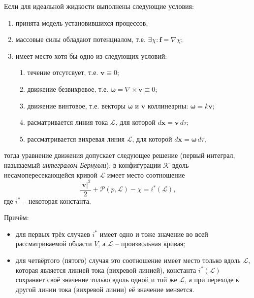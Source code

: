
\begin{theorem}
  Если для идеальной жидкости выполнены следующие условия:
  \begin{enumerate}
    \item принята модель установившихся процессов;
    \item массовые силы обладают потенциалом, т.е. $\exists \chi : \mathbf{f} = \nabla \chi$;
    \item имеет место хотя бы одно из следующих условий:
      \begin{enumerate}
        \item течение отсутсвует, т.е. $\mathbf{v} \equiv 0$;
        \item движение безвихревое, т.е. $\mathbf{\omega} = \nabla \times \mathbf{v} \equiv 0$;
        \item движение винтовое, т.е. векторы $\mathbf{\omega}$ и $\mathbf{v}$ коллинеарны:
          $\mathbf{\omega} = k \mathbf{v}$;
        \item расматривается линия тока $\mathcal{L}$, для которой $d\mathbf{x} = \mathbf{v} \, d\tau$;
        \item рассматривается вихревая линия $\mathcal{L}$, для которой $d\mathbf{x} = \mathbf{\omega} \, d\tau$,
      \end{enumerate}
  \end{enumerate}
  тогда уравнение движения допускает следующее решение (первый интеграл, называемый 
  \emph{интегралом Бернулли}): в конфигурации $\mathcal{K}$ вдоль несамопересекающейся кривой
  $\mathcal{L}$ имеет место соотношение
  \[
    \dfrac{|\mathbf{v}|^2}{2} + \mathcal{P}(p, \mathcal{L}) - \chi = i^* (\mathcal{L}),
  \]
  где $i^*$ -- некоторая константа.

  Причём:
  \begin{itemize}
    \item для первых трёх случаев $i^*$ имеет одно и тоже значение во всей рассматриваемой области
      $V$, а $\mathcal{L}$ -- произвольная кривая;
    \item для четвёртого (пятого) случая это соотношение имеет место только вдоль $\mathcal{L}$,
      которая является линией тока (вихревой линией), константа $i^*(\mathcal{L})$ сохраняет 
      своё значение только вдоль одной и той же $\mathcal{L}$, а при переходе к другой линии тока
      (вихревой линии) её значение меняется.
  \end{itemize}
\end{theorem}


